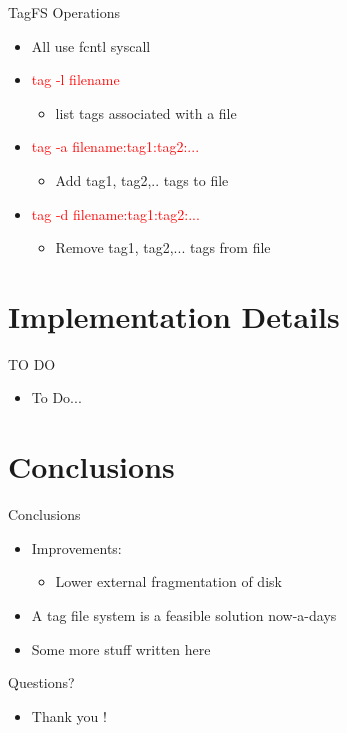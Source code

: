 \documentclass{beamer}
\begin{document}
\begin{frame}{TagFS Operations}
    \begin{itemize}
        \item {All use fcntl syscall}
        \item \textcolor{red}{ tag -l filename}
            \begin{itemize}
                \item{list tags associated with a file}
            \end{itemize}
        \item \textcolor{red}{ tag -a filename:tag1:tag2:...}
            \begin{itemize}
                \item{Add tag1, tag2,.. tags to file}
            \end{itemize}
        \item \textcolor{red}{ tag -d filename:tag1:tag2:...}
            \begin{itemize}
                \item{Remove tag1, tag2,... tags from file}
            \end{itemize}
    \end{itemize}
\end{frame}


\section{Implementation Details}
\begin{frame}{TO DO}
    \begin{itemize}
      \item{To Do...}
    \end{itemize}
\end{frame}


\section{Conclusions}
\begin{frame}{Conclusions}
    \begin{itemize}
        \item {Improvements:}
	\begin{itemize}
		\item{Lower external fragmentation of disk}
	\end{itemize}
        \item {A tag file system is a feasible solution now-a-days}
	\item {Some more stuff written here ~~~} 
    \end{itemize}
\end{frame}

\begin{frame}{Questions?}
    \begin{itemize}
	\item {Thank you !} 
    \end{itemize}
\end{frame}
\end{document}
